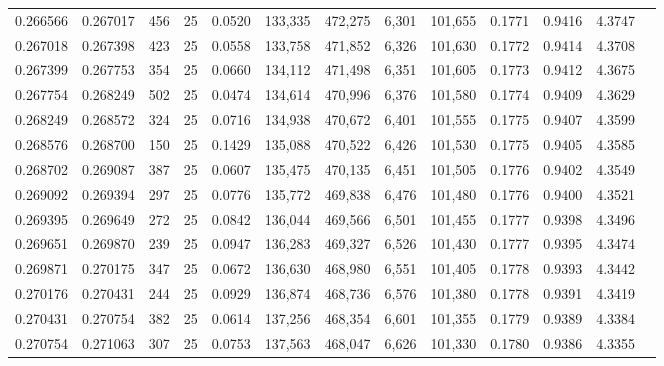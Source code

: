 \begin{tabular}{rrrrrrrrrrrrr}
0.266566 & 0.267017 &   456 &  25 &                                     0.0520 & 133,335 & 472,275 &   6,301 & 101,655 & 0.1771 & 0.9416 & 4.3747 \\
0.267018 & 0.267398 &   423 &  25 &                                     0.0558 & 133,758 & 471,852 &   6,326 & 101,630 & 0.1772 & 0.9414 & 4.3708 \\
0.267399 & 0.267753 &   354 &  25 &                                     0.0660 & 134,112 & 471,498 &   6,351 & 101,605 & 0.1773 & 0.9412 & 4.3675 \\
0.267754 & 0.268249 &   502 &  25 &                                     0.0474 & 134,614 & 470,996 &   6,376 & 101,580 & 0.1774 & 0.9409 & 4.3629 \\
0.268249 & 0.268572 &   324 &  25 &                                     0.0716 & 134,938 & 470,672 &   6,401 & 101,555 & 0.1775 & 0.9407 & 4.3599 \\
0.268576 & 0.268700 &   150 &  25 &                                     0.1429 & 135,088 & 470,522 &   6,426 & 101,530 & 0.1775 & 0.9405 & 4.3585 \\
0.268702 & 0.269087 &   387 &  25 &                                     0.0607 & 135,475 & 470,135 &   6,451 & 101,505 & 0.1776 & 0.9402 & 4.3549 \\
0.269092 & 0.269394 &   297 &  25 &                                     0.0776 & 135,772 & 469,838 &   6,476 & 101,480 & 0.1776 & 0.9400 & 4.3521 \\
0.269395 & 0.269649 &   272 &  25 &                                     0.0842 & 136,044 & 469,566 &   6,501 & 101,455 & 0.1777 & 0.9398 & 4.3496 \\
0.269651 & 0.269870 &   239 &  25 &                                     0.0947 & 136,283 & 469,327 &   6,526 & 101,430 & 0.1777 & 0.9395 & 4.3474 \\
0.269871 & 0.270175 &   347 &  25 &                                     0.0672 & 136,630 & 468,980 &   6,551 & 101,405 & 0.1778 & 0.9393 & 4.3442 \\
0.270176 & 0.270431 &   244 &  25 &                                     0.0929 & 136,874 & 468,736 &   6,576 & 101,380 & 0.1778 & 0.9391 & 4.3419 \\
0.270431 & 0.270754 &   382 &  25 &                                     0.0614 & 137,256 & 468,354 &   6,601 & 101,355 & 0.1779 & 0.9389 & 4.3384 \\
0.270754 & 0.271063 &   307 &  25 &                                     0.0753 & 137,563 & 468,047 &   6,626 & 101,330 & 0.1780 & 0.9386 & 4.3355 \\

\end{tabular}
